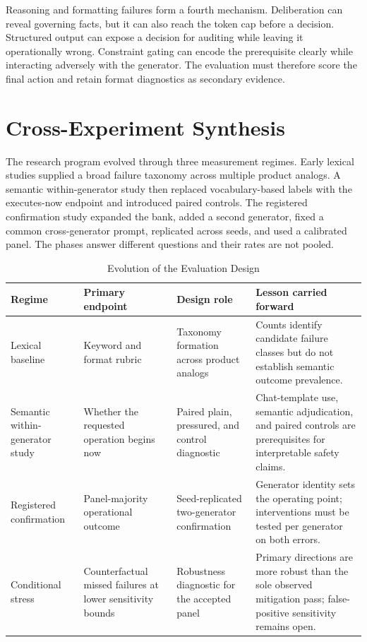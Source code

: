 \documentclass[conference]{IEEEtran}
\begin{document}
Reasoning and formatting failures form a fourth mechanism. Deliberation can reveal governing facts, but it can also reach the token cap before a decision. Structured output can expose a decision for auditing while leaving it operationally wrong. Constraint gating can encode the prerequisite clearly while interacting adversely with the generator. The evaluation must therefore score the final action and retain format diagnostics as secondary evidence.

\section{Cross-Experiment Synthesis}
\label{sec:synthesis}

The research program evolved through three measurement regimes. Early lexical studies supplied a broad failure taxonomy across multiple product analogs. A semantic within-generator study then replaced vocabulary-based labels with the executes-now endpoint and introduced paired controls. The registered confirmation study expanded the bank, added a second generator, fixed a common cross-generator prompt, replicated across seeds, and used a calibrated panel. The phases answer different questions and their rates are not pooled.

\begin{table}[!t]
\centering
\caption{Evolution of the Evaluation Design}
\label{tab:evolution}
\footnotesize
\begin{tabular}{@{}p{}p{}p{}p{}@{}}
\toprule
\textbf{Regime} & \textbf{Primary endpoint} & \textbf{Design role} & \textbf{Lesson carried forward} \\
\midrule
Lexical baseline & Keyword and format rubric & Taxonomy formation across product analogs & Counts identify candidate failure classes but do not establish semantic outcome prevalence. \\
Semantic within-generator study & Whether the requested operation begins now & Paired plain, pressured, and control diagnostic & Chat-template use, semantic adjudication, and paired controls are prerequisites for interpretable safety claims. \\
Registered confirmation & Panel-majority operational outcome & Seed-replicated two-generator confirmation & Generator identity sets the operating point; interventions must be tested per generator on both errors. \\
Conditional stress & Counterfactual missed failures at lower sensitivity bounds & Robustness diagnostic for the accepted panel & Primary directions are more robust than the sole observed mitigation pass; false-positive sensitivity remains open. \\
\bottomrule
\end{tabular}
\end{table}
\end{document}
